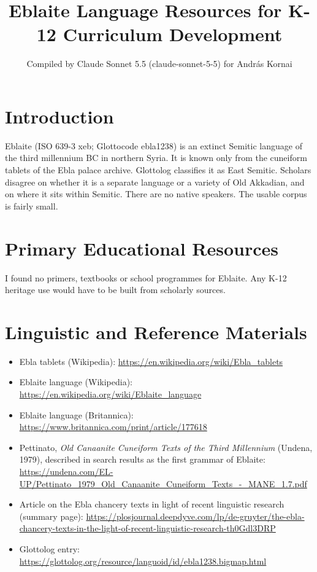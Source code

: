 \documentclass[12pt]{article}
\title{Eblaite Language Resources for K-12 Curriculum Development}
\author{Compiled by Claude Sonnet 5.5 (claude-sonnet-5-5) for Andr\'as Kornai}
\date{}
\begin{document}
\maketitle

\section{Introduction}
Eblaite (ISO 639-3 xeb; Glottocode ebla1238) is an extinct Semitic language of the third millennium BC in northern Syria. It is known only from the cuneiform tablets of the Ebla palace archive. Glottolog classifies it as East Semitic. Scholars disagree on whether it is a separate language or a variety of Old Akkadian, and on where it sits within Semitic. There are no native speakers. The usable corpus is fairly small.

\section{Primary Educational Resources}
I found no primers, textbooks or school programmes for Eblaite. Any K-12 heritage use would have to be built from scholarly sources.

\section{Linguistic and Reference Materials}
\begin{itemize}
\item Ebla tablets (Wikipedia): \url{https://en.wikipedia.org/wiki/Ebla_tablets}
\item Eblaite language (Wikipedia): \url{https://en.wikipedia.org/wiki/Eblaite_language}
\item Eblaite language (Britannica): \url{https://www.britannica.com/print/article/177618}
\item Pettinato, \emph{Old Canaanite Cuneiform Texts of the Third Millennium} (Undena, 1979), described in search results as the first grammar of Eblaite: \url{https://undena.com/EL-UP/Pettinato_1979_Old_Canaanite_Cuneiform_Texts_-_MANE_1.7.pdf}
\item Article on the Ebla chancery texts in light of recent linguistic research (summary page): \url{https://plosjournal.deepdyve.com/lp/de-gruyter/the-ebla-chancery-texts-in-the-light-of-recent-linguistic-research-th0Gdl3DRP}
\item Glottolog entry: \url{https://glottolog.org/resource/languoid/id/ebla1238.bigmap.html}
\end{itemize}
\end{document}
